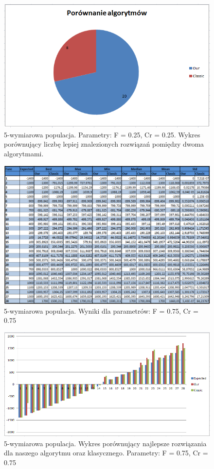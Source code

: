 \documentclass[a4paper]{article}
\begin{document}
\begin{figure}[!h]
\centering
\includegraphics[width=\textwidth]{F75Cr5L5statystyka.png}
\caption{5-wymiarowa populacja. Parametry: F = 0.25, Cr = 0.25. Wykres porównujący liczbę lepiej znalezionych rozwiązań pomiędzy dwoma algorytmami.}
\end{figure}

\begin{figure}[!h]
\centering
\includegraphics[width=\textwidth]{F75Cr75L5tab.png}
\caption{5-wymiarowa populacja. Wyniki dla parametrów: F = 0.75, Cr = 0.75}
\end{figure}

\begin{figure}[!h]
\centering
\includegraphics[width=\textwidth]{F75Cr75L5chart.png}
\caption{5-wymiarowa populacja. Wykres porównujący najlepsze rozwiązania dla naszego algorytmu oraz klasycznego. Parametry: F = 0.75, Cr = 0.75}
\end{figure}
\end{document}
